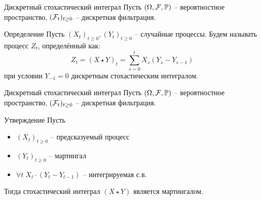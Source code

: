 \documentclass{beamer}
\begin{document}
\begin{frame}{Дискретный стохастический интеграл}
    Пусть $(\Omega, \mathcal{F}, \mathbb{P})$ -- вероятностное пространство, $(\mathcal{F}_t)_{t\geq 0}$ -- дискретная фильтрация.
    \begin{block}{Определение}
    Пусть $(X_t)_{t\geq 0}, (Y_t)_{t \geq 0}$ -- случайные процессы. Будем называть процесс $Z_t$, определённый как:
    $$
        Z_t = (X\star Y)_t = \sum_{s=0}^t X_s (Y_s-Y_{s-1})
    $$при условии $Y_{-1} = 0$ дискретным стохастическим интегралом.
    \end{block}
\end{frame}

\begin{frame}{Дискретный стохастический интеграл}
    Пусть $(\Omega, \mathcal{F}, \mathbb{P})$ -- вероятностное пространство, $(\mathcal{F}_t)_{t\geq 0}$ -- дискретная фильтрация.

    \begin{block}{Утверждение}
        Пусть 
        \begin{itemize}
            \item $(X_t)_{t\geq 0}$ -- предсказуемый процесс
            \item $ (Y_t)_{t \geq 0}$ -- мартингал
            \item $\forall t \; X_t \cdot (Y_t-Y_{t-1})$ -- интегрируемая с.в. 
        \end{itemize}
        Тогда стохастический интеграл $(X\star Y)$ является мартингалом.
    \end{block}
\end{frame}
\end{document}
